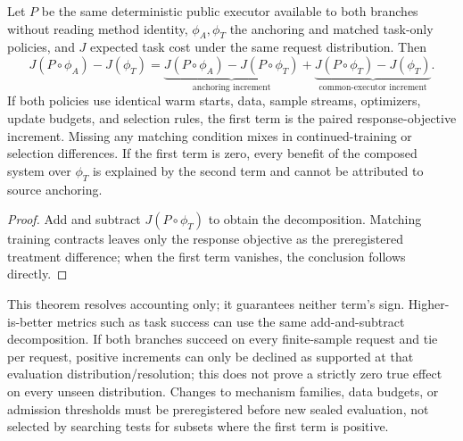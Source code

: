 \begin{proposition}
Let $P$ be the same deterministic public executor available to both branches without reading method identity,
$\phi_A,\phi_T$ the anchoring and matched task-only policies, and $J$ expected task cost under the same
request distribution. Then
\begin{equation}
 J(P\circ\phi_A)-J(\phi_T)
 =\underbrace{J(P\circ\phi_A)-J(P\circ\phi_T)}_{\text{anchoring increment}}
 +\underbrace{J(P\circ\phi_T)-J(\phi_T)}_{\text{common-executor increment}}.
 \label{eq:executor-attribution}
\end{equation}
If both policies use identical warm starts, data, sample streams, optimizers, update budgets, and selection rules,
the first term is the paired response-objective increment. Missing any matching condition mixes in
continued-training or selection differences. If the first term is zero, every benefit of the composed system over
$\phi_T$ is explained by the second term and cannot be attributed to source anchoring.
\end{proposition}
\begin{proof}
Add and subtract $J(P\circ\phi_T)$ to obtain the decomposition. Matching training contracts leaves only the response objective
as the preregistered treatment difference; when the first term vanishes, the conclusion follows directly.
\end{proof}
This theorem resolves accounting only; it guarantees neither term's sign. Higher-is-better metrics such as task success can use
the same add-and-subtract decomposition. If both branches succeed on every finite-sample request and tie per request, positive increments
can only be declined as supported at that evaluation distribution/resolution; this does not prove a strictly zero true effect
on every unseen distribution. Changes to mechanism families, data budgets, or admission thresholds must be preregistered
before new sealed evaluation, not selected by searching tests for subsets where the first term is positive.

